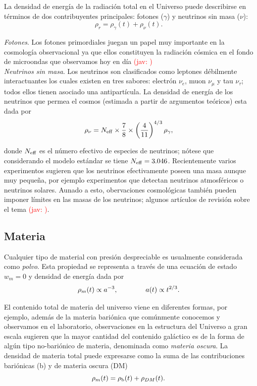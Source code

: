 \documentclass[10.5pt,prb,
               showpacs,            %
               preprintnumbers,     %
               aps,                 %
               prl,          	    %
               letterpaper,             %
               superscriptaddress,      %
               nofootinbib,         %
               tightenlines,        %
               floats,floatfix      %
               ,usenatbib]{revtex4-1}%
\def\beq{\begin{equation}}
\def\eeq{\end{equation}}
\newcommand{\jav}[1]{\textcolor{red}{(jav: #1)}}
\begin{document}
\noindent
La densidad de energ\'ia de la radiaci\'on total en el Universo puede describirse en t\'erminos
de dos contribuyentes principales: fotones ($\gamma$) y neutrinos sin masa ($\nu$):
%
	\beq
		\rho_r = \rho_\gamma(t) + \rho_\nu(t).
	\eeq

\textit{Fotones}. Los fotones primordiales juegan un papel muy importante en la cosmolog\'ia 
observacional  ya que ellos constituyen la radiaci\'on c\'osmica en el fondo de microondas que observamos
hoy en d\'ia \jav{ \cite{alguna cita}}
\\

\textit{Neutrinos sin masa}. Los neutrinos son clasificados como leptones d\'ebilmente interactuantes los cuales existen
en tres sabores: electr\'on $\nu_e$, muon $\nu_\mu$ y tau $\nu_\tau$; todos ellos tienen asociado una antipart\'icula. 
La densidad de energ\'ia  de los neutrinos que permea el cosmos (estimada a partir de argumentos te\'oricos) esta
dada por 
%
	\beq \label{eq:nu}
		\rho_\nu = N_{\rm eff} \times \frac{7}{8}\times \left(\frac{4}{11} \right)^{4/3}\rho_\gamma,
	\eeq

\noindent
donde $N_{\rm eff}$ es el n\'umero efectivo de especies de neutrinos; n\'otese que considerando el modelo est\'andar se tiene $N_{\rm eff}=3.046$.
Recientemente varios experimentos sugieren que los neutrinos efectivamente poseen 
una masa aunque muy peque\~na, por ejemplo experimentos que detectan neutrinos atmosf\'ericos o neutrinos solares.
Aunado a esto, obervaciones cosmol\'ogicas tambi\'en pueden imponer l\'imites en las masas de los neutrinos; algunos art\'iculos
de revisi\'on sobre el tema \jav{\cite{algo}}.


\subsection*{Materia}

Cualquier tipo de material con presi\'on despreciable es usualmente considerada como \textit{polvo}. 
Esta propiedad se representa a trav\'es de una ecuaci\'on de estado $w_m=0$ y densidad de energ\'ia dada por
%
	\beq
		\rho_m(t) \propto a^{-3}, \qquad {\rm} \qquad a(t)\propto t^{2/3}.
	\eeq
	
\noindent
El contenido total de materia del universo viene en diferentes formas,  por ejemplo, adem\'as de la materia bari\'onica que 
com\'unmente conocemos y observamos en el laboratorio, observaciones en la estructura del Universo a gran escala 
sugieren que la mayor cantidad del contenido gal\'actico es de la forma de alg\'un tipo no-bari\'onico de materia, denominada 
como \textit{materia oscura}. 
La densidad de materia total puede expresarse como la suma de las contribuciones bari\'onicas (b)
y de materia oscura (DM)
%
	\beq
		\rho_m(t) = \rho_{\rm b}(t) + \rho_{DM}(t).
	\eeq
\end{document}
